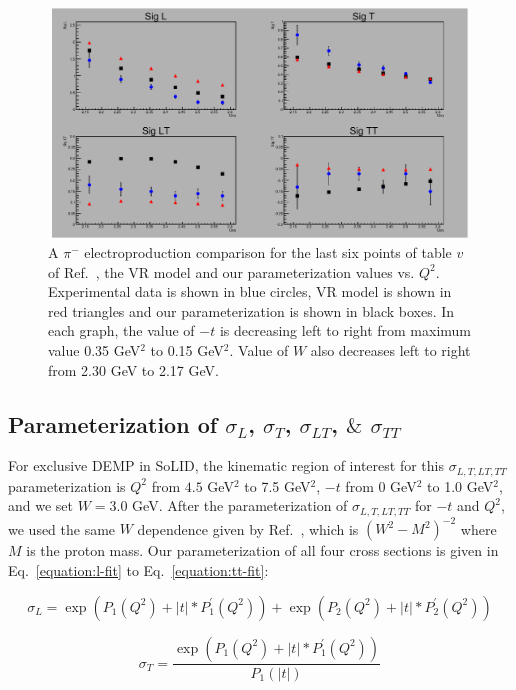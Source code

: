 \begin{figure}[!hbt]
    \centering
    \includegraphics[width=6.0in,height=2.4in]{./figures/pimsigma_qsq.pdf}
    \caption{A $\pi^{-}$ electroproduction comparison for the last six points
      of table $v$ of Ref.~\cite{gmhuber-2}, the VR model and our
      parameterization values vs. $Q^{2}$. Experimental data is shown in blue
      circles, VR model is shown in red triangles and our parameterization is
      shown in black boxes. In each graph, the value of $-t$ is decreasing left
      to right from maximum value 0.35 GeV$^2$ to 0.15 GeV$^2$. Value of $W$
      also decreases left to right from 2.30 GeV to 2.17 GeV.}
    \label{fig:expvrfit}
\end{figure}

\subsection{Parameterization of $\sigma_{L}$, $\sigma_{T}$, $\sigma_{LT}$, 
$\&$ $\sigma_{TT}$}

For exclusive DEMP in SoLID, the kinematic region of interest for this
$\sigma_{L,T,LT,TT}$ parameterization is $Q^2$ from $4.5$ GeV$^2$ to 7.5
GeV$^2$, $-t$ from 0 GeV$^2$ to 1.0 GeV$^2$, and we set $W=3.0$ GeV. After
the parameterization of $\sigma_{L,T,LT,TT}$ for $-t$ and $Q^2$, we used the
same $W$ dependence given by Ref.~\cite{Fpi2}, which is $(W^2-M^2)^{-2}$
where $M$ is the proton mass. Our parameterization of all four cross sections
is given in Eq.~\ref{equation:l-fit} to Eq.~\ref{equation:tt-fit}:

\begin{equation}
        \sigma_{L} = \exp{(P_1(Q^2) + |t| * P^{\prime}_1(Q^2))} +
        \exp{(P_2(Q^2) + |t| * P^{\prime}_2(Q^2))}
     \label{equation:l-fit}
\end{equation}

\begin{equation}
        \sigma_{T} = \frac{\exp{(P_1(Q^2) + |t| *
            P^{\prime}_1(Q^2))}}{P_{1}(|t|)}
     \label{equation:t-fit}
\end{equation}

